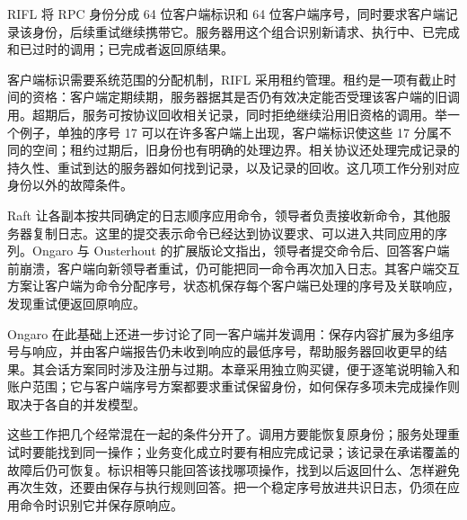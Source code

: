 RIFL 将 RPC 身份分成 64 位客户端标识和 64 位客户端序号，同时要求客户端记录该身份，后续重试继续携带它。服务器用这个组合识别新请求、执行中、已完成和已过时的调用；已完成者返回原结果\cite{rifl}。

客户端标识需要系统范围的分配机制，RIFL 采用租约管理。租约是一项有截止时间的资格：客户端定期续期，服务器据其是否仍有效决定能否受理该客户端的旧调用。超期后，服务可按协议回收相关记录，同时拒绝继续沿用旧资格的调用。举一个例子，单独的序号 17 可以在许多客户端上出现，客户端标识使这些 17 分属不同的空间；租约过期后，旧身份也有明确的处理边界。相关协议还处理完成记录的持久性、重试到达的服务器如何找到记录，以及记录的回收。这几项工作分别对应身份以外的故障条件。

Raft 让各副本按共同确定的日志顺序应用命令，领导者负责接收新命令，其他服务器复制日志。这里的提交表示命令已经达到协议要求、可以进入共同应用的序列。Ongaro 与 Ousterhout 的扩展版论文指出，领导者提交命令后、回答客户端前崩溃，客户端向新领导者重试，仍可能把同一命令再次加入日志。其客户端交互方案让客户端为命令分配序号，状态机保存每个客户端已处理的序号及关联响应，发现重试便返回原响应\cite{raft}。

Ongaro 在此基础上还进一步讨论了同一客户端并发调用：保存内容扩展为多组序号与响应，并由客户端报告仍未收到响应的最低序号，帮助服务器回收更早的结果。其会话方案同时涉及注册与过期\cite{ongaro}。本章采用独立购买键，便于逐笔说明输入和账户范围；它与客户端序号方案都要求重试保留身份，如何保存多项未完成操作则取决于各自的并发模型。



这些工作把几个经常混在一起的条件分开了。调用方要能恢复原身份；服务处理重试时要能找到同一操作；业务变化成立时要有相应完成记录；该记录在承诺覆盖的故障后仍可恢复。标识相等只能回答该找哪项操作，找到以后返回什么、怎样避免再次生效，还要由保存与执行规则回答。把一个稳定序号放进共识日志，仍须在应用命令时识别它并保存原响应。
\FloatBarrier
